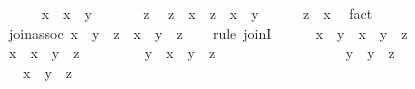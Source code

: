 \begin{isabellebody}
\isanewline
\ \ \ \ \isamarkupfalse%
\ {\isachardoublequoteopen}x\ {\isasymsqsubseteq}\ x\ {\isasymsqunion}\ y{\isachardoublequoteclose}\ \isacommand{{\isachardot}{\isachardot}}\isamarkupfalse%
\isanewline
\ \ \ \ \isamarkupfalse%
\ z\ \isamarkupfalse%
\ {\isachardoublequoteopen}z\ {\isasymsqsubseteq}\ x{\isachardoublequoteclose}\ \ {\isachardoublequoteopen}z\ {\isasymsqsubseteq}\ x\ {\isasymsqunion}\ y{\isachardoublequoteclose}\isanewline
\ \ \ \ \isamarkupfalse%
\ {\isachardoublequoteopen}z\ {\isasymsqsubseteq}\ x{\isachardoublequoteclose}\ \isamarkupfalse%
\ fact\isanewline
\ \ \isamarkupfalse%
\isanewline
\isanewline
\ \ \isamarkupfalse%
\ join{\isacharunderscore}assoc{\isacharcolon}\ {\isachardoublequoteopen}{\isacharparenleft}x\ {\isasymsqunion}\ y{\isacharparenright}\ {\isasymsqunion}\ z\ {\isacharequal}\ x\ {\isasymsqunion}\ {\isacharparenleft}y\ {\isasymsqunion}\ z{\isacharparenright}{\isachardoublequoteclose}\isanewline
\ \ \isamarkupfalse%
\ {\isacharparenleft}rule\ joinI{\isacharparenright}\isanewline
\ \ \ \ \isamarkupfalse%
\ {\isachardoublequoteopen}x\ {\isasymsqunion}\ y\ {\isasymsqsubseteq}\ x\ {\isasymsqunion}\ {\isacharparenleft}y\ {\isasymsqunion}\ z{\isacharparenright}{\isachardoublequoteclose}\isanewline
\ \ \ \ \isamarkupfalse%
\isanewline
\ \ \ \ \ \ \isamarkupfalse%
\ {\isachardoublequoteopen}x\ {\isasymsqsubseteq}\ x\ {\isasymsqunion}\ {\isacharparenleft}y\ {\isasymsqunion}\ z{\isacharparenright}{\isachardoublequoteclose}\ \isacommand{{\isachardot}{\isachardot}}\isamarkupfalse%
\isanewline
\ \ \ \ \ \ \isamarkupfalse%
\ {\isachardoublequoteopen}y\ {\isasymsqsubseteq}\ x\ {\isasymsqunion}\ {\isacharparenleft}y\ {\isasymsqunion}\ z{\isacharparenright}{\isachardoublequoteclose}\isanewline
\ \ \ \ \ \ \isamarkupfalse%
\ {\isacharminus}\isanewline
\ \ \ \ \ \ \ \ \isamarkupfalse%
\ {\isachardoublequoteopen}y\ {\isasymsqsubseteq}\ y\ {\isasymsqunion}\ z{\isachardoublequoteclose}\ \isacommand{{\isachardot}{\isachardot}}\isamarkupfalse%
\isanewline
\ \ \ \ \ \ \ \ \isamarkupfalse%
\ \isamarkupfalse%
\ {\isachardoublequoteopen}{\isachardot}{\isachardot}{\isachardot}\ {\isasymsqsubseteq}\ x\ {\isasymsqunion}\ {\isacharparenleft}y\ {\isasymsqunion}\ z{\isacharparenright}{\isachardoublequoteclose}\ \isacommand{{\isachardot}{\isachardot}}\isamarkupfalse%

\end{isabellebody}
